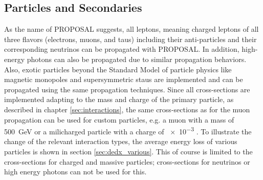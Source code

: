 %

\subsection{Particles and Secondaries} \label{sec:particle}

As the name of PROPOSAL suggests, all leptons, meaning charged leptons of all three flavors (electrons, muons, and taus) including their anti-particles and their corresponding neutrinos can be propagated with PROPOSAL.
In addition, high-energy photons can also be propagated due to similar propagation behaviors.
Also, exotic particles beyond the Standard Model of particle physics like magnetic monopoles and supersymmetric staus are implemented and can be propagated using the same propagation techniques.
Since all cross-sections are implemented adapting to the mass and charge of the primary particle, as described in chapter \ref{sec:interactions}, the same cross-sections as for the muon propagation can be used for custom particles, e.g. a muon with a mass of \SI{500}{GeV} or a milicharged particle with a charge of \num{e-3} \cite{Plestid20MiliCharged, Arguelles21MiliCharged}.
To illustrate the change of the relevant interaction types, the average energy loss of various particles is shown in section \ref{sec:dedx_various}.
This of course is limited to the cross-sections for charged and massive particles; cross-sections for neutrinos or high energy photons can not be used for this.

